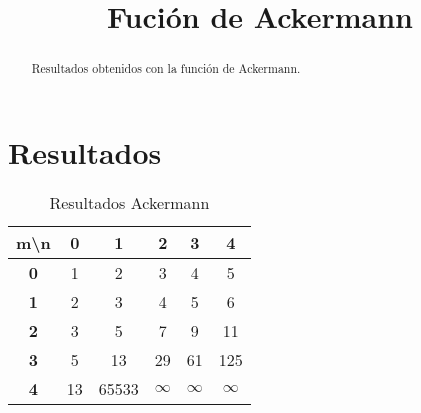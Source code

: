
\title{Fución de Ackermann}

\maketitle
\begin{abstract}
    Resultados obtenidos con la función de Ackermann.
\end{abstract}
\section{Resultados}

\begin{table}[h]
    \centering
    \begin{tabular}{|c|c|c|c|c|c|}
        \hline
        \textbf{m\textbackslash n} & \textbf{0} & \textbf{1} & \textbf{2} & \textbf{3} & \textbf{4} \\ \hline
        \textbf{0} & 1 & 2 & 3 & 4 & 5 \\ \hline
        \textbf{1} & 2 & 3 & 4 & 5 & 6 \\ \hline
        \textbf{2} & 3 & 5 & 7 & 9 & 11 \\ \hline
        \textbf{3} & 5 & 13 & 29 & 61 & 125 \\ \hline
        \textbf{4} & 13 & 65533 & \textbf{$\infty$} & \textbf{$\infty$} & \textbf{$\infty$} \\ \hline
    \end{tabular}
    \caption{Resultados Ackermann}
    \label{table:Ack}
\end{table}
